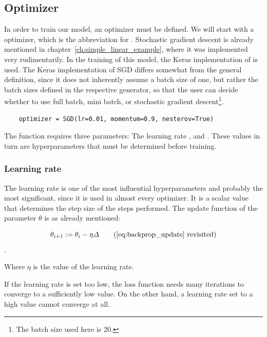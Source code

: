 \subsection{Optimizer} \label{ch:optimizer}

In order to train our model, an optimizer must be defined.
We will start with a  optimizer, which is the abbreviation for .
Stochastic gradient descent is already mentioned in chapter~\ref{ch:simple_linear_example}, where it was implemented very rudimentarily. In the training of this model, the Keras implementation of  is used.
The Keras implementation of SGD differs somewhat from the general definition, since it does not inherently assume a batch size of one, but rather the batch sizes defined in the respective generator, so that the user can decide whether to use full batch, mini batch, or stochastic gradient descent\footnote{The batch size used here is 20.}.

\begin{lstlisting}
    optimizer = SGD(lr=0.01, momentum=0.9, nesterov=True)
\end{lstlisting}

The function  requires three parameters: The learning rate ,  and .
These values in turn are hyperparameters that must be determined before training.

\subsubsection{Learning rate}

The learning rate is one of the most influential hyperparameters and probably the most significant, since it is used in almost every optimizer.
It is a scalar value that determines the step size of the steps performed. The update function of the parameter $\theta$ is as already mentioned:

\begin{equation}
    \theta_{i+1} := \theta_i - \eta \varDelta \tag{\ref{eq:backprop_update} revisited}
\end{equation}.

Where $\eta$ is the value of the learning rate.

If the learning rate is set too low, the loss function needs many iterations to converge to a sufficiently low value.
On the other hand, a learning rate set to a high value cannot converge at all.

